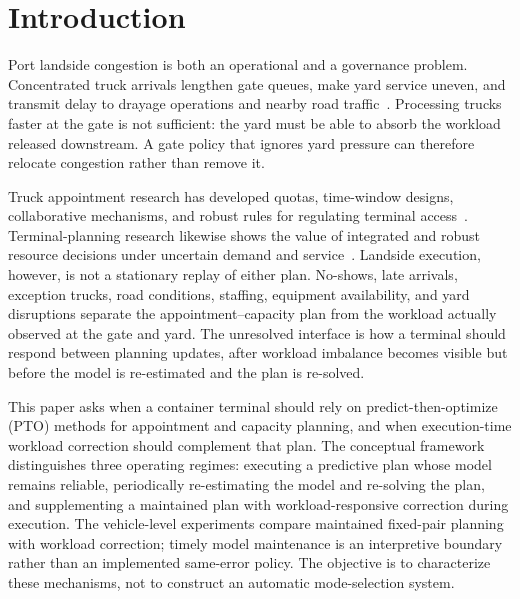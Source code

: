 \documentclass[preprint,12pt,authoryear,a4paper]{elsarticle}
\begin{document}
\section{Introduction}
\label{sec:introduction}

Port landside congestion is both an operational and a governance problem. Concentrated truck arrivals lengthen gate queues, make yard service uneven, and transmit delay to drayage operations and nearby road traffic~\citep{GuanLiu2009GateAppointment,TorkjaziHuynhShiri2018TruckTours}. Processing trucks faster at the gate is not sufficient: the yard must be able to absorb the workload released downstream. A gate policy that ignores yard pressure can therefore relocate congestion rather than remove it.

Truck appointment research has developed quotas, time-window designs, collaborative mechanisms, and robust rules for regulating terminal access~\citep{GuanLiu2009GateAppointment,TorkjaziHuynhShiri2018TruckTours,ImYuLee2020TruckAppointmentCooperation,AzabKaramEltawil2017DynamicCollaborativeTAS,LiJiaTaoLin2024RobustGateAppointment}. Terminal-planning research likewise shows the value of integrated and robust resource decisions under uncertain demand and service~\citep{RodriguesAgra2022Survey,AgraRodrigues2022DROBAP,ZhenEtAl2022BerthYard,TanHeWang2017FlexibleYardTemplate}. Landside execution, however, is not a stationary replay of either plan. No-shows, late arrivals, exception trucks, road conditions, staffing, equipment availability, and yard disruptions separate the appointment--capacity plan from the workload actually observed at the gate and yard. The unresolved interface is how a terminal should respond between planning updates, after workload imbalance becomes visible but before the model is re-estimated and the plan is re-solved.

This paper asks when a container terminal should rely on predict-then-optimize (PTO) methods for appointment and capacity planning, and when execution-time workload correction should complement that plan. The conceptual framework distinguishes three operating regimes: executing a predictive plan whose model remains reliable, periodically re-estimating the model and re-solving the plan, and supplementing a maintained plan with workload-responsive correction during execution. The vehicle-level experiments compare maintained fixed-pair planning with workload correction; timely model maintenance is an interpretive boundary rather than an implemented same-error policy. The objective is to characterize these mechanisms, not to construct an automatic mode-selection system.
\end{document}
